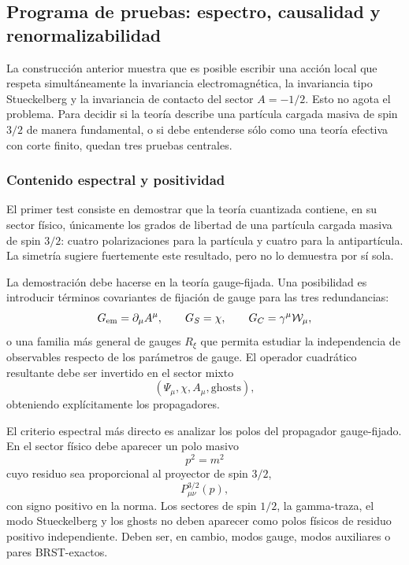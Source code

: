 \documentclass[11pt,a4paper]{article}
\numberwithin{equation}{section}
\newcommand{\Wcal}{\mathcal W}
\begin{document}
\subsection{Programa de pruebas: espectro, causalidad y renormalizabilidad}
\label{subsec:programa-de-pruebas-espectro-causalidad-y-renormal}

La construcción anterior muestra que es posible escribir una acción local que respeta
simultáneamente la invariancia electromagnética, la invariancia tipo Stueckelberg y la
invariancia de contacto del sector $A=-1/2$. Esto no agota el problema. Para decidir si
la teoría describe una partícula cargada masiva de spin $3/2$ de manera fundamental, o
si debe entenderse sólo como una teoría efectiva con corte finito, quedan tres pruebas
centrales.

\subsubsection{Contenido espectral y positividad}
\label{subsubsec:contenido-espectral-y-positividad}

El primer test consiste en demostrar que la teoría cuantizada contiene, en su sector
físico, únicamente los grados de libertad de una partícula cargada masiva de spin $3/2$:
cuatro polarizaciones para la partícula y cuatro para la antipartícula. La simetría sugiere
fuertemente este resultado, pero no lo demuestra por sí sola.

La demostración debe hacerse en la teoría gauge-fijada. Una posibilidad es introducir
términos covariantes de fijación de gauge para las tres redundancias:
\begin{equation}
  G_{\rm em}=\partial_\mu A^\mu,\qquad
  G_S=\chi,\qquad
  G_C=\gamma^\mu \Wcal_\mu ,
\end{equation}
o una familia más general de gauges $R_\xi$ que permita estudiar la independencia
de observables respecto de los parámetros de gauge. El operador cuadrático resultante
debe ser invertido en el sector mixto
\begin{equation}
  (\Psi_\mu,\chi,A_\mu,\text{ghosts}),
\end{equation}
obteniendo explícitamente los propagadores.

El criterio espectral más directo es analizar los polos del propagador gauge-fijado.
En el sector físico debe aparecer un polo masivo
\begin{equation}
  p^2=m^2
\end{equation}
cuyo residuo sea proporcional al proyector de spin $3/2$,
\begin{equation}
  P^{3/2}_{\mu\nu}(p),
\end{equation}
con signo positivo en la norma. Los sectores de spin $1/2$, la gamma-traza, el modo
Stueckelberg y los ghosts no deben aparecer como polos físicos de residuo positivo
independiente. Deben ser, en cambio, modos gauge, modos auxiliares o pares
BRST-exactos.
\end{document}
